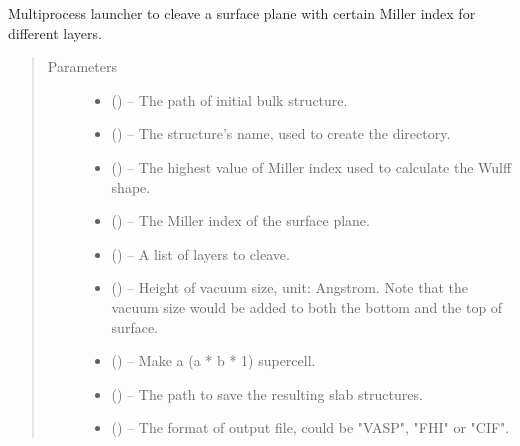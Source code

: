 \documentclass[letterpaper,10pt,english,openany,oneside]{sphinxmanual}
\begin{document}
\begin{fulllineitems}
\label{\detokenize{index:ogre.generators.cleave_for_surface_energies}}
Multiprocess launcher to cleave a surface plane with certain Miller index
for different layers.
\begin{quote}\begin{description}
\item[{Parameters}] \leavevmode\begin{itemize}
\item {} 
 () -- The path of initial bulk structure.

\item {} 
 () -- The structure's name, used to create the directory.

\item {} 
 () -- The highest value of Miller index used to calculate the Wulff shape.

\item {} 
 () -- The Miller index of the surface plane.

\item {} 
 () -- A list of layers to cleave.

\item {} 
 () -- Height of vacuum size, unit: Angstrom. Note that the vacuum size
would be added to both the bottom and the top of surface.

\item {} 
 () -- Make a (a * b * 1) supercell.

\item {} 
 () -- The path to save the resulting slab structures.

\item {} 
 () -- The format of output file, could be "VASP", "FHI" or "CIF".

\end{itemize}

\end{description}\end{quote}

\end{fulllineitems}
\end{document}
